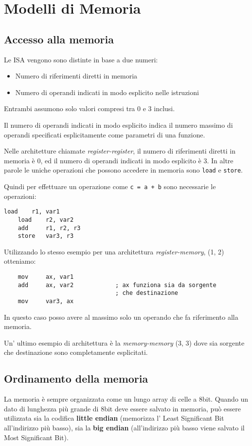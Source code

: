 \documentclass[../ace.tex]{subfiles}
\begin{document}
\section{Modelli di Memoria}
\subsection{Accesso alla memoria}
Le ISA vengono sono distinte in base a due numeri:
\begin{itemize}
    \item Numero di riferimenti diretti in memoria
    \item Numero di operandi indicati in modo esplicito nelle istruzioni
\end{itemize}
Entrambi assumono solo valori compresi tra 0 e 3 inclusi.

Il numero di operandi indicati in modo esplicito indica il numero massimo di operandi specificati
esplicitamente come parametri di una funzione.

Nelle architetture chiamate \textit{register-register}, il numero di riferimenti diretti in memoria è 0,
ed il numero di operandi indicati in modo esplicito è 3.
In altre parole le uniche operazioni che possono accedere in memoria sono \lstinline{load} e \lstinline{store}.

Quindi per effettuare un operazione come \lstinline{c = a + b} sono necessarie le operazioni:

\begin{lstlisting}[emph={load,store,add}, emphstyle={\bfseries\color{code-keyword}}]
    load    r1, var1
    load    r2, var2
    add     r1, r2, r3
    store   var3, r3
\end{lstlisting}

Utilizzando lo stesso esempio per una architettura \textit{register-memory}, (1, 2) otteniamo:
\begin{lstlisting}
    mov     ax, var1
    add     ax, var2            ; ax funziona sia da sorgente
                                ; che destinazione
    mov     var3, ax
\end{lstlisting}
In questo caso posso avere al massimo solo un operando che fa riferimento alla memoria.

Un' ultimo esempio di architettura è la \textit{memory-memory} (3, 3) dove sia sorgente che destinazione
sono completamente esplicitati.

\subsection{Ordinamento della memoria}
La memoria è sempre organizzata come un lungo array di celle a 8bit.
Quando un dato di lunghezza più grande di 8bit deve essere salvato in memoria, può essere
utilizzata sia la codifica \textbf{little endian} (memorizza l' Least Significant Bit all'indirizzo
più basso), sia la \textbf{big endian} (all'indirizzo più basso viene salvato il Most Significant
Bit).
\end{document}
